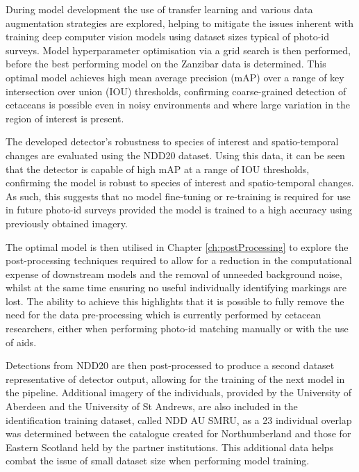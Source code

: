 During model development the use of transfer learning and various data augmentation strategies are explored, helping to mitigate the issues inherent with training deep computer vision models using dataset sizes typical of photo-id surveys. Model hyperparameter optimisation via a grid search is then performed, before the best performing model on the Zanzibar data is determined. This optimal model achieves high mean average precision (mAP) over a range of key intersection over union (IOU) thresholds, confirming coarse-grained detection of cetaceans is possible even in noisy environments and where large variation in the region of interest is present. 

The developed detector's robustness to species of interest and spatio-temporal changes are evaluated using the NDD20 dataset. Using this data, it can be seen that the detector is capable of high mAP at a range of IOU thresholds, confirming the model is robust to species of interest and spatio-temporal changes. As such, this suggests that no model fine-tuning or re-training is required for use in future photo-id surveys provided the model is trained to a high accuracy using previously obtained imagery. 

The optimal model is then utilised in Chapter \ref{ch:postProcessing} to explore the post-processing techniques required to allow for a reduction in the computational expense of downstream models and the removal of unneeded background noise, whilst at the same time ensuring no useful individually identifying markings are lost. The ability to achieve this highlights that it is possible to fully remove the need for the data pre-processing which is currently performed by cetacean researchers, either when performing photo-id matching manually or with the use of aids.

Detections from NDD20 are then post-processed to produce a second dataset representative of detector output, allowing for the training of the next model in the pipeline. Additional imagery of the individuals, provided by the University of Aberdeen and the University of St Andrews, are also included in the identification training dataset, called NDD AU SMRU, as a 23 individual overlap was determined between the catalogue created for Northumberland and those for Eastern Scotland held by the partner institutions. This additional data helps combat the issue of small dataset size when performing model training. 

